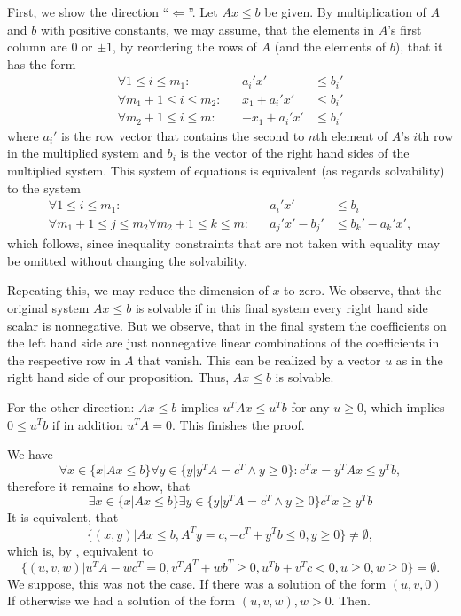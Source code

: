 \documentclass{scrartcl}
\newcommand\1{\mathbf{1}}
\begin{document}
\begin{Proof}
First, we show the direction \enquote{$\Leftarrow$}. Let $Ax \le b$ be given. By multiplication of $A$ and $b$ with positive constants, we may assume, that the elements in $A$'s first column are $0$ or $\pm 1$, by reordering the rows of $A$ (and the elements of $b$), that it has the form
\begin{alignat*}
\forall 1 \le i \le m_1 \colon &&a_i' x'& \le b_i'\\
\forall m_1+1 \le i \le m_2 \colon &&x_1+a_i' x'& \le b_i'\\
\forall m_2+1 \le i \le m \colon &&-x_1+a_i' x'& \le b_i'
\end{alignat*}
where $a_i'$ is the row vector that contains the second to $n$th element of $A$'s $i$th row in the multiplied system and $b_i$ is the vector of the right hand sides of the multiplied system. This system of equations is equivalent (as regards solvability) to the system
\begin{alignat*}
\forall 1 \le i \le m_1 \colon &&a_i' x'& \le b_i\\
\forall m_1+1 \le j \le m_2 \forall m_2+1 \le k\le m \colon &&a_j' x'-b_j'& \le b_k' - a_k'x',
\end{alignat*}
which follows, since inequality constraints that are not taken with equality may be omitted without changing the solvability. 

Repeating this, we may reduce the dimension of $x$ to zero. We observe, that the original system $Ax \le b$ is solvable if in this final system every right hand side scalar is nonnegative. But we observe, that in the final system the coefficients on the left hand side are just nonnegative linear combinations of the coefficients in the respective row in $A$ that vanish. This can be realized by a vector $u$ as in the right hand side of our proposition. Thus, $Ax \le b$ is solvable.

For the other direction: $A x \le b$ implies $u^T A x \le u^T b$ for any $u \ge 0$, which implies $0 \le u^T b$ if in addition $u^T A = 0$. This finishes the proof.
\end{Proof}
\begin{Theorem}
\end{Theorem}
\begin{Proof}
We have
\[
\forall x \in \{x|Ax\le b\} \forall y \in  \{y|y^TA = c^T \wedge y\ge 0\} \colon c^Tx =y^TAx \le y^Tb,
\]
therefore it remains to show, that 
\[
\exists x \in \{x|Ax\le b\} \exists y \in  \{y|y^TA = c^T \wedge y\ge 0\} c^Tx\ge y^Tb
\]
It is equivalent, that
\[
\{(x,y) | A x \le b, A^Ty = c, -c^T + y^Tb \le 0, y \ge 0\}\neq \emptyset,
\]
which is, by , equivalent to 
\[
\{(u,v,w) | u^TA - wc^T = 0 , v^TA^T + wb^T \ge 0, u^Tb+v^Tc < 0 , u \ge 0, w \ge 0\}= \emptyset.
\]
We suppose, this was not the case. If there was a solution of the form $(u,v,0)$
\[
\]
If otherwise we had a solution of the form $(u,v,w), w >0$. Then. 
\end{Proof}
\end{document}
